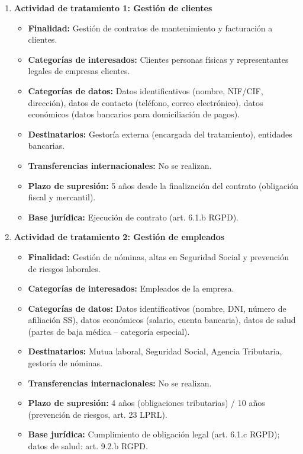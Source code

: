 \begin{solution}
\begin{enumerate}[label=\textbf{\arabic*.}]
		\item \textbf{Actividad de tratamiento 1: Gestión de clientes}
		      \begin{itemize}
			      \item \textbf{Finalidad:} Gestión de contratos de mantenimiento y facturación a clientes.
			      \item \textbf{Categorías de interesados:} Clientes personas físicas y representantes
			            legales de empresas clientes.
			      \item \textbf{Categorías de datos:} Datos identificativos (nombre, NIF/CIF, dirección),
			            datos de contacto (teléfono, correo electrónico), datos económicos (datos bancarios
			            para domiciliación de pagos).
			      \item \textbf{Destinatarios:} Gestoría externa (encargada del tratamiento), entidades
			            bancarias.
			      \item \textbf{Transferencias internacionales:} No se realizan.
			      \item \textbf{Plazo de supresión:} 5 años desde la finalización del contrato (obligación
			            fiscal y mercantil).
			      \item \textbf{Base jurídica:} Ejecución de contrato (art. 6.1.b RGPD).
		      \end{itemize}

		\item \textbf{Actividad de tratamiento 2: Gestión de empleados}
		      \begin{itemize}
			      \item \textbf{Finalidad:} Gestión de nóminas, altas en Seguridad Social y prevención
			            de riesgos laborales.
			      \item \textbf{Categorías de interesados:} Empleados de la empresa.
			      \item \textbf{Categorías de datos:} Datos identificativos (nombre, DNI, número de
			            afiliación SS), datos económicos (salario, cuenta bancaria), datos de salud (partes
			            de baja médica -- categoría especial).
			      \item \textbf{Destinatarios:} Mutua laboral, Seguridad Social, Agencia Tributaria,
			            gestoría de nóminas.
			      \item \textbf{Transferencias internacionales:} No se realizan.
			      \item \textbf{Plazo de supresión:} 4 años (obligaciones tributarias) / 10 años
			            (prevención de riesgos, art. 23 LPRL).
			      \item \textbf{Base jurídica:} Cumplimiento de obligación legal (art. 6.1.c RGPD);
			            datos de salud: art. 9.2.b RGPD.
		      \end{itemize}
	\end{enumerate}
\end{solution}
